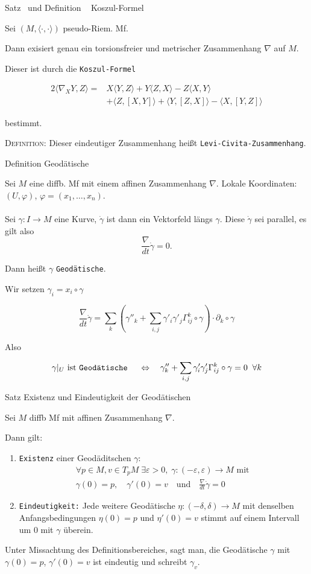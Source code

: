 \documentclass[a6paper,11pt,grid=front]{kartei}
\newcommand{\fl}[1]{\begin{flushleft}
 #1 \end{flushleft}}
\renewcommand{\epsilon}{\varepsilon}
\newcommand{\blf}[1]{\langle #1 \rangle}
\newcounter{def}
\newcounter{satz}
\newcommand{\thisdef}{\thedef\ \stepcounter{def}}
\newcommand{\thissatz}{\thesatz\ \stepcounter{satz}}
\begin{document}
\newcommand{\dg}[3]{#1\blf{#2,#3}}
\newcommand{\blfL}[3]{\blf{#1,[#2,#3]}}
\nonameyet
{Satz \thissatz und Definition \thisdef} {Koszul-Formel}
{
Sei $(M,\blf{\cdot,\cdot})$ pseudo-Riem. Mf.
\fl{Dann exisiert genau ein torsionsfreier und metrischer Zusammenhang $\nabla$
auf $M$.}
\fl{Dieser ist durch die \texttt{Koszul-Formel}}
\[
\begin{aligned}
2\blf{\nabla_X Y, Z} =& 
\dg{X}{Y}{Z} + \dg{Y}{Z}{X} - \dg{Z}{X}{Y}
\\&
+ \blfL{Z}{X}{Y} + \blfL{Y}{Z}{X} - \blfL{X}{Y}{Z}
\end{aligned}
\]
\fl{bestimmt.}
\fl{\textsc{Definition:} Dieser eindeutiger Zusammenhang heißt 
\texttt{Levi-Civita-Zusammenhang}.}
}
{}

\nonameyet
{Definition} {Geodätische}
{
\scriptsize
Sei $M$ eine diffb. Mf mit einem affinen Zusammenhang $\nabla$.
Lokale Koordinaten: $(U,\varphi)$, $\varphi = (x_1,\dots,x_n)$.
%
\\
~\\
\small
Sei $\gamma : I \to M$ eine Kurve, $\dot \gamma $ ist dann ein Vektorfeld
längs $\gamma$. Diese $\dot \gamma$ sei parallel, es gilt also
\[
\frac{\nabla}{dt} \dot\gamma = 0.
\]
\fl{Dann heißt $\gamma$ \texttt{Geodätische}.}
\footnotesize
\fl{Wir setzen $\gamma_i = x_i \circ \gamma$}
\[
\frac{\nabla}{dt} \dot \gamma 
= \sum_k \left( 
\gamma''_k + \sum_{i,j} \gamma'_i \gamma'_j \Gamma^k_{ij}\circ \gamma
\right) 
\cdot \partial_k \circ \gamma
\]
\fl{Also}
\[
\gamma|_U \text{ ist \texttt{Geodätische} }
\quad \Leftrightarrow \quad
\gamma''_k + \sum_{i,j} \gamma'_i \gamma'_j \Gamma^k_{ij}\circ \gamma = 0
\;\; \forall k
\]
}
{}

\nonameyet
{\small Satz} {\small Existenz und Eindeutigkeit der Geodätischen}
{
\small
Sei $M$ diffb Mf mit affinen Zusammenhang $\nabla$. 
\fl{Dann gilt:}
\begin{enumerate}[1.]
\item \texttt{Existenz} einer Geodäditschen $\gamma$: 
\vspace{-0.7em}
\[
\begin{aligned}
\forall p\in M, v\in T_pM \; \exists \epsilon > 0, \;
\gamma:(-\epsilon,\epsilon) \to M \text{ mit } 
\\ 
\gamma(0) = p, 
\quad 
\gamma'(0) = v 
\quad \text{und} \quad 
\frac{\nabla}{dt} \dot \gamma = 0
\end{aligned}
\]
%
\item \texttt{Eindeutigkeit:} Jede weitere Geodätische 
$\eta: (-\delta,\delta) \to M$ mit denselben Anfangsbedingungen
$\eta(0) = p$ und $\eta'(0) = v$ stimmt auf einem Intervall um $0$
mit $\gamma$ überein.
\end{enumerate}
%
\scriptsize
Unter Missachtung des Definitionsbereiches, sagt man, die Geodätische 
$\gamma$ mit $\gamma(0) = p$, $\gamma'(0) = v$ ist eindeutig und schreibt
$\gamma_v$.
\\
}
{}
\end{document}
